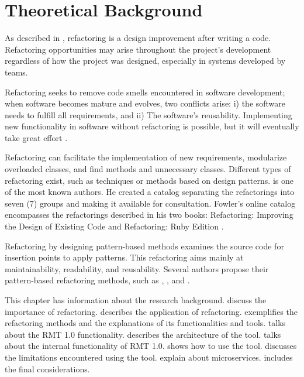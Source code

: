 \chapter{Theoretical Background}
\label{cap-background}

As described in \textcite{fowler2018refactoring}, refactoring is a design improvement after writing a code. Refactoring opportunities may arise throughout the project's development regardless of how the project was designed, especially in systems developed by teams.

Refactoring seeks to remove code smells encountered in software development; when software becomes mature and evolves, two conflicts arise: i) the software needs to fulfill all requirements, and ii) The software's reusability. Implementing new functionality in software without refactoring is possible, but it will eventually take great effort \cite{Gamma2009}.

Refactoring can facilitate the implementation of new requirements, modularize overloaded classes, and find methods and unnecessary classes. Different types of refactoring exist, such as techniques or methods based on design patterns. \textcite{fowler2018refactoring} is one of the most known authors. He created a catalog separating the refactorings into seven (7) groups and making it available for consultation. Fowler's online catalog encompasses the refactorings described in his two books: Refactoring: Improving the Design of Existing Code \cite{fowler2018refactoring} and Refactoring: Ruby Edition \cite{fields2009refactoring}. 

Refactoring by designing pattern-based methods examines the source code for insertion points to apply patterns. This refactoring aims mainly at maintainability, readability, and reusability. Several authors propose their pattern-based refactoring methods, such as \textcite{cinneide2000automated}, \textcite{Gamma2009}, and \textcite{ouni2017more}.

This chapter has information about the research background.  discuss the importance of refactoring.  describes the application of refactoring.  exemplifies the refactoring methods and the explanations of its functionalities and tools.  talks about the RMT 1.0 functionality.  describes the architecture of the tool.  talks about the internal functionality of RMT 1.0.  shows how to use the tool.  discusses the limitations encountered using the tool.  explain about microservices.  includes the final considerations.

